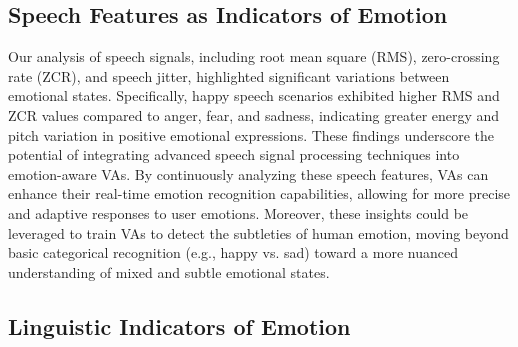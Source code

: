 \subsection{Speech Features as Indicators of Emotion}

Our analysis of speech signals, including root mean square (RMS), zero-crossing rate (ZCR), and speech jitter, highlighted significant variations between emotional states. Specifically, happy speech scenarios exhibited higher RMS and ZCR values compared to anger, fear, and sadness, indicating greater energy and pitch variation in positive emotional expressions. These findings underscore the potential of integrating advanced speech signal processing techniques into emotion-aware VAs. By continuously analyzing these speech features, VAs can enhance their real-time emotion recognition capabilities, allowing for more precise and adaptive responses to user emotions. Moreover, these insights could be leveraged to train VAs to detect the subtleties of human emotion, moving beyond basic categorical recognition (e.g., happy vs. sad) toward a more nuanced understanding of mixed and subtle emotional states.

\subsection{Linguistic Indicators of Emotion}

